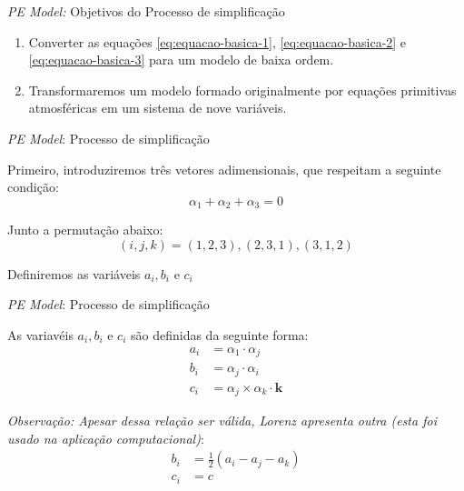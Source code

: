 
\begin{frame}{\textit{PE Model:} Objetivos do Processo de simplificação}

\begin{enumerate}
    \item Converter as equações \eqref{eq:equacao-basica-1}, \eqref{eq:equacao-basica-2} e \eqref{eq:equacao-basica-3} para um modelo de baixa ordem. 
    \item Transformaremos um modelo formado originalmente por equações primitivas atmosféricas em um sistema de nove variáveis.
\end{enumerate}
    
\end{frame}


\begin{frame}{\textit{PE Model}: Processo de simplificação}

Primeiro, introduziremos três vetores adimensionais, que respeitam a seguinte condição:
\begin{equation}
    \alpha_1 + \alpha_2 + \alpha_3 = 0
\end{equation}

Junto a permutação abaixo:
\begin{equation}
    (i, j, k) = (1,2,3), (2,3,1), (3,1,2) \label{eq:permutacao}
\end{equation}

Definiremos as variáveis $a_i, b_i$ e $c_i$
\end{frame}


\begin{frame}{\textit{PE Model}: Processo de simplificação}

As variavéis $a_i, b_i$ e $c_i$ são definidas da seguinte forma:
\begin{align*}
    a_i &= \alpha_1 \cdot \alpha_j\\
    b_i &= \alpha_j \cdot \alpha_i\\
    c_i &= \alpha_j \times \alpha_k \cdot \mathbf{k}
\end{align*}

\textit{Observação: Apesar dessa relação ser  válida, Lorenz apresenta outra (esta foi usado na aplicação computacional)}:
\begin{align*}
    b_i &= \frac{1}{2}\left(a_i - a_j - a_k\right)\\
    c_i &= c
\end{align*}
\end{frame}

